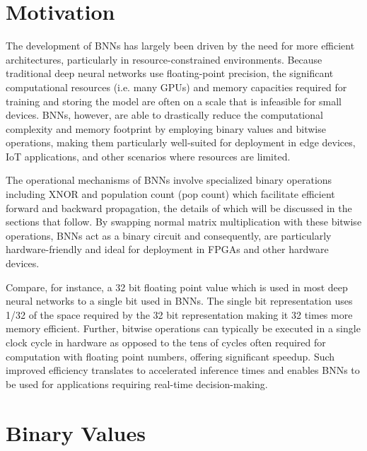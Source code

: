 \section{Motivation}

The development of BNNs has largely been driven by the need for more efficient architectures, particularly in resource-constrained environments. Because traditional deep neural networks use floating-point precision, the significant computational resources (i.e. many GPUs) and memory capacities required for training and storing the model are often on a scale that is infeasible for small devices. BNNs, however, are able to drastically reduce the computational complexity and memory footprint by employing binary values and bitwise operations, making them particularly well-suited for deployment in edge devices, IoT applications, and other scenarios where resources are limited. 

The operational mechanisms of BNNs involve specialized binary operations including XNOR and population count (pop count) which facilitate efficient forward and backward propagation, the details of which will be discussed in the sections that follow. By swapping normal matrix multiplication with these bitwise operations, BNNs act as a binary circuit and consequently, are particularly hardware-friendly and ideal for deployment in FPGAs and other hardware devices. 

Compare, for instance, a 32 bit floating point value which is used in most deep neural networks to a single bit used in BNNs. The single bit representation uses 1/32 of the space required by the 32 bit representation making it 32 times more memory efficient. Further, bitwise operations can typically be executed in a single clock cycle in hardware as opposed to the tens of cycles often required for computation with floating point numbers, offering significant speedup. Such improved efficiency translates to accelerated inference times and enables BNNs to be used for applications requiring real-time decision-making.



\section{Binary Values}

